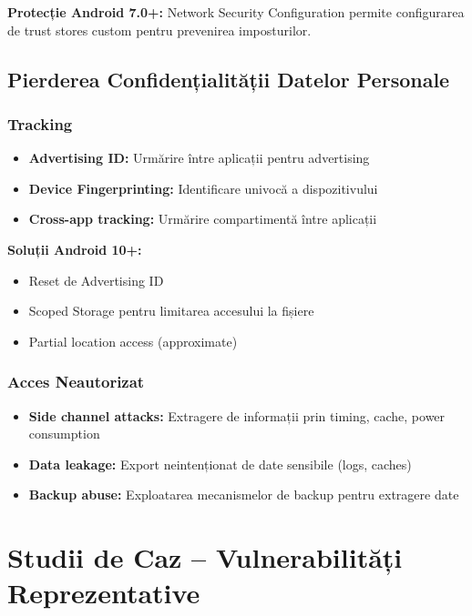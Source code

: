\documentclass[11pt,a4paper,twocolumn]{article}
\theoremstyle{definition}
\theoremstyle{plain}
\theoremstyle{remark}
\begin{document}
\textbf{Protecție Android 7.0+:} Network Security Configuration permite configurarea de trust stores 
custom pentru prevenirea imposturilor.

\subsection{Pierderea Confidențialității Datelor Personale}

\subsubsection{Tracking}
\begin{itemize}
    \item \textbf{Advertising ID:} Urmărire între aplicații pentru advertising
    \item \textbf{Device Fingerprinting:} Identificare univocă a dispozitivului
    \item \textbf{Cross-app tracking:} Urmărire compartimentă între aplicații
\end{itemize}

\textbf{Soluții Android 10+:}
\begin{itemize}
    \item Reset de Advertising ID
    \item Scoped Storage pentru limitarea accesului la fișiere
    \item Partial location access (approximate)
\end{itemize}

\subsubsection{Acces Neautorizat}
\begin{itemize}
    \item \textbf{Side channel attacks:} Extragere de informații prin timing, cache, power consumption
    \item \textbf{Data leakage:} Export neintenționat de date sensibile (logs, caches)
    \item \textbf{Backup abuse:} Exploatarea mecanismelor de backup pentru extragere date
\end{itemize}

\section{Studii de Caz – Vulnerabilități Reprezentative}
\end{document}
